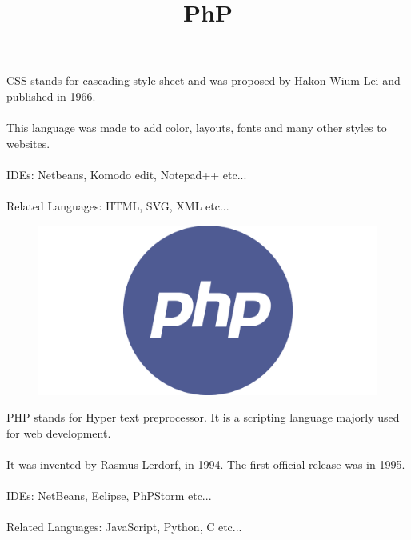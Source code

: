 \documentclass{article}
\begin{document}
	\newpage
	CSS stands for cascading style sheet and was proposed by Hakon Wium Lei and published in 1966.
	\paragraph{}
	This language was made to add color, layouts, fonts and many other styles to websites.
	\paragraph{}
	IDEs: Netbeans, Komodo edit, Notepad++ etc...
	\paragraph{}
	Related Languages: HTML, SVG, XML etc... 
	
	\newpage
	\title{PhP}
	\begin{figure}	
		\includegraphics[width=\linewidth]{php.png}
	\end{figure}

	\newpage
	PHP stands for Hyper text preprocessor. It is a scripting language majorly used for web development.
	\paragraph{}
	It was invented by Rasmus Lerdorf, in 1994. The first official release was in 1995.
	\paragraph{}
	IDEs: NetBeans, Eclipse, PhPStorm etc...
	\paragraph{}
	Related Languages: JavaScript, Python, C etc...
	
\end{document}

